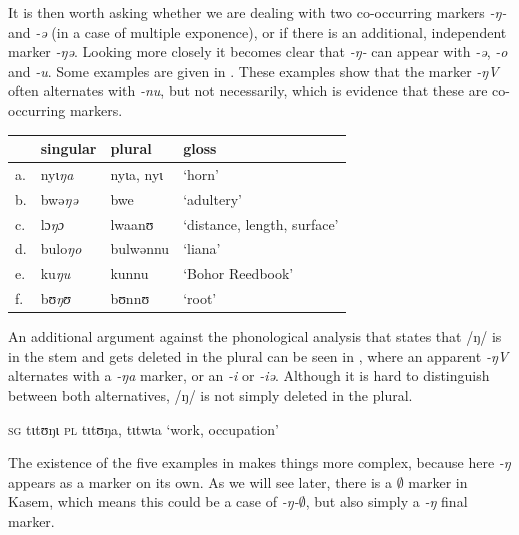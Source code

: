 It is then worth asking whether we are dealing with two co-occurring markers \textit{-ŋ-} and \textit{-ə} (in a case of multiple exponence), or if there is an additional, independent marker \textit{-ŋə}. Looking more closely it becomes clear that \textit{-ŋ-} can appear with \textit{-ə}, \textit{-o} and \textit{-u}. Some examples are given in . These examples show that the marker \textit{-ŋV} often alternates with \textit{-nu}, but not necessarily, which is evidence that these are co-occurring markers.

\begin{exe}
    \ex \label{exes-ng}
    \begin{tabular}[t]{llll}
      & singular        & plural    & gloss                       \\
      \midrule
      a. & nyɩ\textit{ŋa}  & nyɩa, nyɩ & `horn'                      \\
      b. & bwə\textit{ŋə}  & bwe       & `adultery'                  \\
      c. & lɔ\textit{ŋɔ}   & lwaanʊ    & `distance, length, surface' \\
      d. & bulo\textit{ŋo} & bulwənnu  & `liana'                     \\
      e. & ku\textit{ŋu}   & kunnu     & `Bohor Reedbook'            \\
      f. & bʊ\textit{ŋʊ}   & bʊnnʊ     & `root'                      \\
    \end{tabular}
\end{exe}

An additional argument against the phonological analysis that states that /ŋ/ is in the stem and gets deleted in the plural can be seen in , where an apparent  \textit{-ŋV} alternates with a \textit{-ŋa} marker, or an \textit{-i} or \textit{-iə}. Although it is hard to distinguish between both alternatives, /ŋ/ is not simply deleted in the plural.

\begin{exe}
    \ex \label{except-ng2} \textsc{sg} tɩtʊŋɩ \textsc{pl} tɩtʊŋa, tɩtwɩa `work, occupation'
\end{exe}

The existence of the five examples in  makes things more complex, because here \textit{-ŋ} appears as a marker on its own. As we will see later, there is a $\emptyset$ marker in Kasem, which means this could be a case of \textit{-ŋ-$\emptyset$}, but also simply a \textit{-ŋ} final marker.

